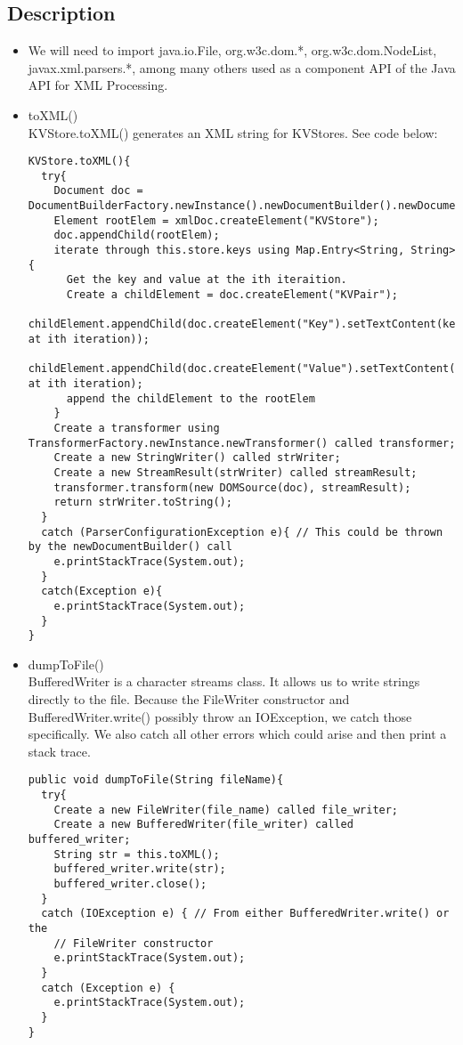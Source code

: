 \documentclass{article}
\begin{document}
\subsection*{Description}
\begin{itemize}
\item
We will need to import java.io.File, org.w3c.dom.*, org.w3c.dom.NodeList, javax.xml.parsers.*, among many others used as a component API of the Java API for XML Processing.

\item 
toXML()\\
KVStore.toXML() generates an XML string for KVStores. See code below:
\begin{verbatim}
KVStore.toXML(){
  try{
    Document doc = DocumentBuilderFactory.newInstance().newDocumentBuilder().newDocument();
    Element rootElem = xmlDoc.createElement("KVStore");
    doc.appendChild(rootElem);
    iterate through this.store.keys using Map.Entry<String, String>{
      Get the key and value at the ith iteraition.
      Create a childElement = doc.createElement("KVPair");
      childElement.appendChild(doc.createElement("Key").setTextContent(key at ith iteration));
      childElement.appendChild(doc.createElement("Value").setTextContent(value at ith iteration);
      append the childElement to the rootElem
    }
    Create a transformer using TransformerFactory.newInstance.newTransformer() called transformer;
    Create a new StringWriter() called strWriter;
    Create a new StreamResult(strWriter) called streamResult;
    transformer.transform(new DOMSource(doc), streamResult);
    return strWriter.toString();
  }
  catch (ParserConfigurationException e){ // This could be thrown by the newDocumentBuilder() call
    e.printStackTrace(System.out);
  }
  catch(Exception e){
    e.printStackTrace(System.out);
  }
}
\end{verbatim}

\item 
dumpToFile()\\
BufferedWriter is a character streams class. It allows us to write strings directly to the file.
Because the FileWriter constructor and BufferedWriter.write() possibly throw an IOException, we catch those specifically. We also catch all other errors which could arise and then print a stack trace.
\begin{verbatim}
public void dumpToFile(String fileName){
  try{
    Create a new FileWriter(file_name) called file_writer;
    Create a new BufferedWriter(file_writer) called buffered_writer;
    String str = this.toXML();
    buffered_writer.write(str);
    buffered_writer.close();
  }
  catch (IOException e) { // From either BufferedWriter.write() or the
    // FileWriter constructor
    e.printStackTrace(System.out);
  }
  catch (Exception e) {
    e.printStackTrace(System.out);
  }
}
\end{verbatim}


\end{itemize}
\end{document}
